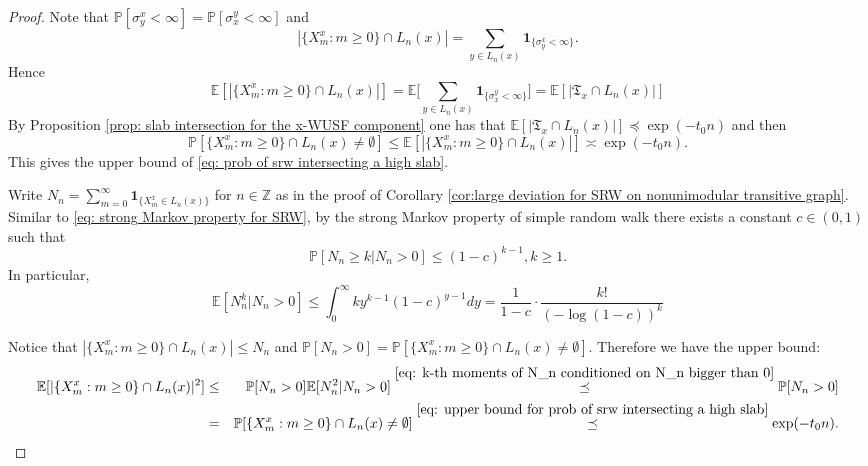 \documentclass[12pt]{article}
\numberwithin{equation}{section}
\newcommand{\be}{\begin{equation}}
\newcommand{\ee}{\end{equation}}
\newcommand{\1}{\mathbf{1}}
\begin{document}
 \begin{proof}
 	Note that $\mathbb{P}[\sigma_y^x<\infty]=\mathbb{P}[\sigma_x^y<\infty]$ and
 	\[
 	|\{X_m^x:m\geq0 \}\cap L_n(x)|=\sum_{y\in L_n(x)}\mathbf{1}_{\{\sigma_y^x<\infty\}}.
 	\]
 	Hence 
 	\[
 	\mathbb{E}[|\{X_m^x:m\geq0 \}\cap L_n(x)|]=\mathbb{E}\Big[ \sum_{y\in L_n(x)}\mathbf{1}_{\{\sigma_x^y<\infty\}}\Big]=\mathbb{E}[|\mathfrak{T}_x\cap L_n(x)|]
 	\]
 	By Proposition \ref{prop: slab intersection for the x-WUSF component} one has that 
 	$	\mathbb{E}[|\mathfrak{T}_x\cap L_n(x)|]	\preceq \exp(-t_0n)$
 	and then
 	\be\label{eq: upper bound for prob of srw intersecting a high slab}
 		\mathbb{P}[\{X_m^x:m\geq0 \}\cap L_n(x)\neq\emptyset]
 		\leq 	\mathbb{E}[|\{X_m^x:m\geq0 \}\cap L_n(x)|]
 		\asymp \exp(-t_0n).
 	\ee
 	This gives the upper bound of \eqref{eq: prob of srw intersecting a high slab}.
 	
 
 	
 	Write $N_n=\sum_{m=0}^{\infty}\mathbf{1}_{ \{X_m^x\in L_n(x)  \} }$ for $n\in\mathbb{Z}$ as in the proof of Corollary \ref{cor:large deviation for SRW on nonunimodular transitive graph}. Similar to \eqref{eq: strong Markov property for SRW}, by the strong Markov property of simple random walk  there exists a constant $c\in (0,1)$ such that 
 	\be\label{eq: N_n geq k conditioned on N_n big than 0}
 	\mathbb{P}[N_n\geq k|N_n>0]\leq (1-c)^{k-1},k\geq 1.
 	\ee
 	In particular,
 	\be\label{eq: k-th moments of N_n conditioned on N_n bigger than 0}
 	\mathbb{E}[N_n^k|N_n>0]\leq \int_{0}^{\infty}ky^{k-1}(1-c)^{y-1}dy=\frac{1}{1-c}\cdot \frac{k!}{(-\log(1-c) )^k}
 	\ee
 	
 	Notice that $|\{X_m^x:m\geq0 \}\cap L_n(x)|\leq N_n$ and $\mathbb{P}[N_n>0]=\mathbb{P}[\{X_m^x:m\geq0 \}\cap L_n(x)\neq\emptyset]$.
 	Therefore we have the upper bound:
 	\begin{eqnarray}\label{eq: second moment for SRW intersect with a high slab}
 		\mathbb{E}[|\{X_m^x:m\geq0 \}\cap L_n(x)|^2]&\leq & \mathbb{P}[N_n>0]\mathbb{E}[N_n^2|N_n>0]\stackrel{\eqref{eq: k-th moments of N_n conditioned on N_n bigger than 0}}{\preceq}\mathbb{P}[N_n>0]\nonumber\\
 		&=& \mathbb{P}[\{X_m^x:m\geq0 \}\cap L_n(x)\neq\emptyset]\stackrel{\eqref{eq: upper bound for prob of srw intersecting a high slab}}{\preceq} \exp(-t_0n).
 	\end{eqnarray}
 	

\end{proof}
\end{document}
